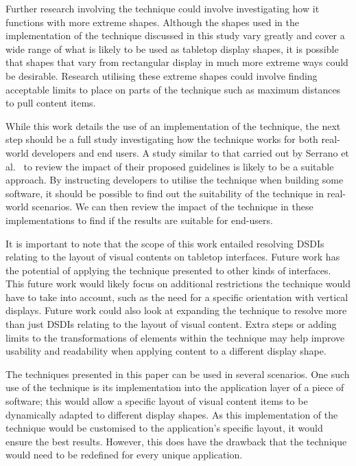 \documentclass[twocolumn,compsoc]{cvm}
\begin{document}
{Further research involving the technique could involve investigating how it functions with more extreme shapes.
Although the shapes used in the implementation of the technique discussed in this study vary greatly and cover a wide range of what is likely to be used as tabletop display shapes, it is possible that shapes that vary from rectangular display in much more extreme ways could be desirable.
Research utilising these extreme shapes could involve finding acceptable limits to place on parts of the technique such as maximum distances to pull content items.

While this work details the use of an implementation of the technique, the next step should be a full study investigating how the technique works for both real-world developers and end users.
A study similar to that carried out by Serrano et al.~\cite{Serrano2017} to review the impact of their proposed guidelines is likely to be a suitable approach.
By instructing developers to utilise the technique when building some software, it should be possible to find out the suitability of the technique in real-world scenarios.
We can then review the impact of the technique in these implementations to find if the results are suitable for end-users.

It is important to note that the scope of this work entailed resolving \acp{DSDI} relating to the layout of visual contents on tabletop interfaces.
Future work has the potential of applying the technique presented to other kinds of interfaces.
This future work would likely focus on additional restrictions the technique would have to take into account, such as the need for a specific orientation with vertical displays.
Future work could also look at expanding the technique to resolve more than just \acp{DSDI} relating to the layout of visual content.
Extra steps or adding limits to the transformations of elements within the technique may help improve usability and readability when applying content to a different display shape.

The techniques presented in this paper can be used in several scenarios.
One such use of the technique is its implementation into the application layer of a piece of software; this would allow a specific layout of visual content items to be dynamically adapted to different display shapes.
As this implementation of the technique would be customised to the application's specific layout, it would ensure the best results.
However, this does have the drawback that the technique would need to be redefined for every unique application.

}
\end{document}
